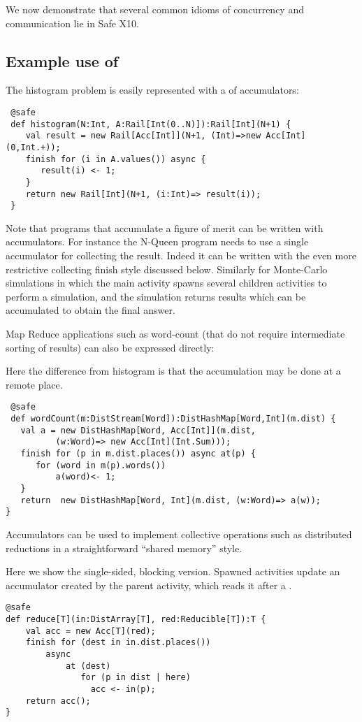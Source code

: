 We now demonstrate that several common idioms of concurrency and
communication lie in Safe X10.

\subsection{Example use of }
\begin{example}[Histogram]
The histogram problem is easily represented with a  of
accumulators: 
\begin{lstlisting}
 @safe
 def histogram(N:Int, A:Rail[Int(0..N)]):Rail[Int](N+1) {
    val result = new Rail[Acc[Int]](N+1, (Int)=>new Acc[Int](0,Int.+));
    finish for (i in A.values()) async {
       result(i) <- 1;
    }
    return new Rail[Int](N+1, (i:Int)=> result(i));
 }
\end{lstlisting}
\end{example}
Note that programs that accumulate a figure of merit can be written
with accumulators. For instance the N-Queen program needs to use a
single accumulator for collecting the result. Indeed it can be written
with the even more restrictive collecting finish style discussed
below. Similarly for Monte-Carlo simulations in which the main
activity spawns several children activities to perform a simulation,
and the simulation returns results which can be accumulated to
obtain the final answer.

Map Reduce applications such as word-count (that do not require
intermediate sorting of results) can also be expressed directly:
\begin{example}
Here the difference from histogram is that the accumulation may be
done at a remote place. 
\begin{lstlisting}
 @safe
 def wordCount(m:DistStream[Word]):DistHashMap[Word,Int](m.dist) {
   val a = new DistHashMap[Word, Acc[Int]](m.dist,
          (w:Word)=> new Acc[Int](Int.Sum)));
   finish for (p in m.dist.places()) async at(p) {
      for (word in m(p).words())
          a(word)<- 1;
   }
   return  new DistHashMap[Word, Int](m.dist, (w:Word)=> a(w));
}
\end{lstlisting}

\end{example}


Accumulators can be used to implement collective operations such as
distributed reductions in a straightforward ``shared memory'' style.

\begin{example}[Reduction]
Here we show the single-sided, blocking version. Spawned activities
update an accumulator created by the parent activity, which reads it
after a . 
  \begin{lstlisting}
@safe
def reduce[T](in:DistArray[T], red:Reducible[T]):T {
    val acc = new Acc[T](red);
    finish for (dest in in.dist.places())
        async
            at (dest) 
               for (p in dist | here)
                 acc <- in(p);
    return acc();
}
\end{lstlisting}
\end{example}


